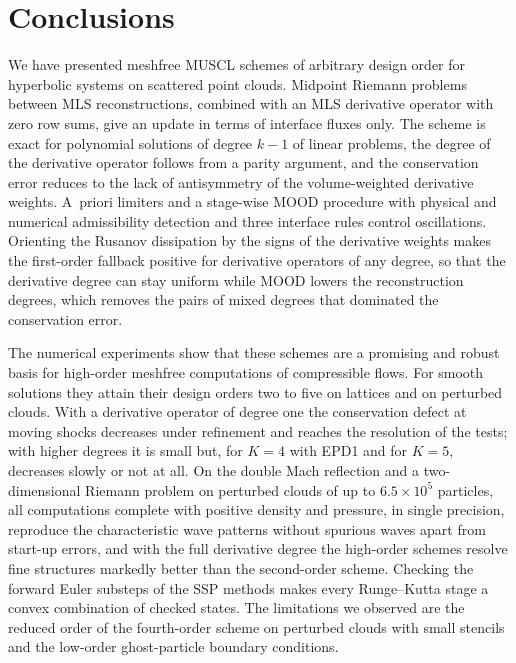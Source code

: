 \documentclass[smallextended]{svjour3}
\numberwithin{equation}{section}
\begin{document}
\section{Conclusions}\label{sec:conclusion}

We have presented meshfree MUSCL schemes of arbitrary design order for hyperbolic systems on scattered point clouds. Midpoint Riemann problems between MLS reconstructions, combined with an MLS derivative operator with zero row sums, give an update in terms of interface fluxes only. The scheme is exact for polynomial solutions of degree $k-1$ of linear problems, the degree of the derivative operator follows from a parity argument, and the conservation error reduces to the lack of antisymmetry of the volume-weighted derivative weights. A~priori limiters and a stage-wise MOOD procedure with physical and numerical admissibility detection and three interface rules control oscillations. Orienting the Rusanov dissipation by the signs of the derivative weights makes the first-order fallback positive for derivative operators of any degree, so that the derivative degree can stay uniform while MOOD lowers the reconstruction degrees, which removes the pairs of mixed degrees that dominated the conservation error.

The numerical experiments show that these schemes are a promising and robust basis for high-order meshfree computations of compressible flows. For smooth solutions they attain their design orders two to five on lattices and on perturbed clouds. With a derivative operator of degree one the conservation defect at moving shocks decreases under refinement and reaches the resolution of the tests; with higher degrees it is small but, for $K=4$ with EPD1 and for $K=5$, decreases slowly or not at all. On the double Mach reflection and a two-dimensional Riemann problem on perturbed clouds of up to $6.5\times10^5$ particles, all computations complete with positive density and pressure, in single precision, reproduce the characteristic wave patterns without spurious waves apart from start-up errors, and with the full derivative degree the high-order schemes resolve fine structures markedly better than the second-order scheme. Checking the forward Euler substeps of the SSP methods makes every Runge--Kutta stage a convex combination of checked states. The limitations we observed are the reduced order of the fourth-order scheme on perturbed clouds with small stencils and the low-order ghost-particle boundary conditions.
\end{document}

